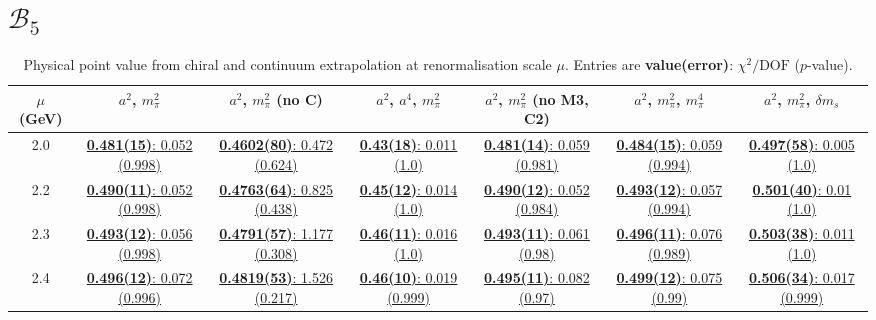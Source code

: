 \documentclass[12pt]{extarticle}
\begin{document}
\section{$\mathcal{B}_5$}
\begin{table}[h!]
\begin{center}
\begin{tabular}{|c|c|c|c|c|c|c|}
\hline
$\mu$ (GeV) & $a^2$, $m_\pi^2$& $a^2$, $m_\pi^2$ (no C)& $a^2$, $a^4$, $m_\pi^2$& $a^2$, $m_\pi^2$ (no M3, C2)& $a^2$, $m_\pi^2$, $m_\pi^4$& $a^2$, $m_\pi^2$, $\delta m_s$\\
\hline
2.0& \hyperlink{TT/SUSY/a2m2_20.pdf.1}{\textbf{0.481(15)}: 0.052 (0.998)} & \hyperlink{TT/SUSY/a2m2noC_20.pdf.1}{\textbf{0.4602(80)}: 0.472 (0.624)} & \hyperlink{TT/SUSY/a2a4m2_20.pdf.1}{\textbf{0.43(18)}: 0.011 (1.0)} & \hyperlink{TT/SUSY/a2m2mcut_20.pdf.1}{\textbf{0.481(14)}: 0.059 (0.981)} & \hyperlink{TT/SUSY/a2m2m4_20.pdf.1}{\textbf{0.484(15)}: 0.059 (0.994)} & \hyperlink{TT/SUSY/a2m2delm_20.pdf.1}{\textbf{0.497(58)}: 0.005 (1.0)}\\
2.2& \hyperlink{TT/SUSY/a2m2_22.pdf.1}{\textbf{0.490(11)}: 0.052 (0.998)} & \hyperlink{TT/SUSY/a2m2noC_22.pdf.1}{\textbf{0.4763(64)}: 0.825 (0.438)} & \hyperlink{TT/SUSY/a2a4m2_22.pdf.1}{\textbf{0.45(12)}: 0.014 (1.0)} & \hyperlink{TT/SUSY/a2m2mcut_22.pdf.1}{\textbf{0.490(12)}: 0.052 (0.984)} & \hyperlink{TT/SUSY/a2m2m4_22.pdf.1}{\textbf{0.493(12)}: 0.057 (0.994)} & \hyperlink{TT/SUSY/a2m2delm_22.pdf.1}{\textbf{0.501(40)}: 0.01 (1.0)}\\
2.3& \hyperlink{TT/SUSY/a2m2_23.pdf.1}{\textbf{0.493(12)}: 0.056 (0.998)} & \hyperlink{TT/SUSY/a2m2noC_23.pdf.1}{\textbf{0.4791(57)}: 1.177 (0.308)} & \hyperlink{TT/SUSY/a2a4m2_23.pdf.1}{\textbf{0.46(11)}: 0.016 (1.0)} & \hyperlink{TT/SUSY/a2m2mcut_23.pdf.1}{\textbf{0.493(11)}: 0.061 (0.98)} & \hyperlink{TT/SUSY/a2m2m4_23.pdf.1}{\textbf{0.496(11)}: 0.076 (0.989)} & \hyperlink{TT/SUSY/a2m2delm_23.pdf.1}{\textbf{0.503(38)}: 0.011 (1.0)}\\
2.4& \hyperlink{TT/SUSY/a2m2_24.pdf.1}{\textbf{0.496(12)}: 0.072 (0.996)} & \hyperlink{TT/SUSY/a2m2noC_24.pdf.1}{\textbf{0.4819(53)}: 1.526 (0.217)} & \hyperlink{TT/SUSY/a2a4m2_24.pdf.1}{\textbf{0.46(10)}: 0.019 (0.999)} & \hyperlink{TT/SUSY/a2m2mcut_24.pdf.1}{\textbf{0.495(11)}: 0.082 (0.97)} & \hyperlink{TT/SUSY/a2m2m4_24.pdf.1}{\textbf{0.499(12)}: 0.075 (0.99)} & \hyperlink{TT/SUSY/a2m2delm_24.pdf.1}{\textbf{0.506(34)}: 0.017 (0.999)}\\
\hline
\end{tabular}
\caption{Physical point value from chiral and continuum extrapolation at renormalisation scale $\mu$. Entries are \textbf{value(error)}: $\chi^2/\text{DOF}$ ($p$-value).}
\end{center}
\end{table}
\end{document}
